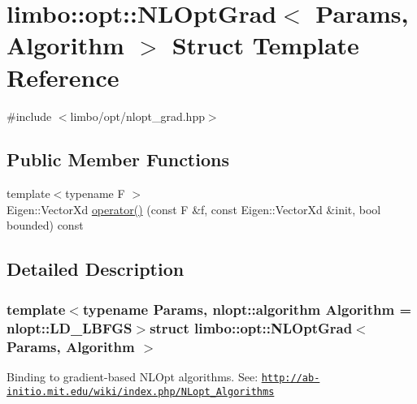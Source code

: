 \hypertarget{structlimbo_1_1opt_1_1_n_l_opt_grad}{}\section{limbo\+:\+:opt\+:\+:N\+L\+Opt\+Grad$<$ Params, Algorithm $>$ Struct Template Reference}
\label{structlimbo_1_1opt_1_1_n_l_opt_grad}


{\ttfamily \#include $<$limbo/opt/nlopt\+\_\+grad.\+hpp$>$}

\subsection*{Public Member Functions}
\begin{DoxyCompactItemize}
\item 
{\footnotesize template$<$typename F $>$ }\\Eigen\+::\+Vector\+Xd \hyperlink{structlimbo_1_1opt_1_1_n_l_opt_grad_a248805060cc986c4553d91f738b8b725}{operator()} (const F \&f, const Eigen\+::\+Vector\+Xd \&init, bool bounded) const 
\end{DoxyCompactItemize}


\subsection{Detailed Description}
\subsubsection*{template$<$typename Params, nlopt\+::algorithm Algorithm = nlopt\+::\+L\+D\+\_\+\+L\+B\+F\+G\+S$>$struct limbo\+::opt\+::\+N\+L\+Opt\+Grad$<$ Params, Algorithm $>$}

Binding to gradient-\/based N\+L\+Opt algorithms. See\+: \href{http://ab-initio.mit.edu/wiki/index.php/NLopt_Algorithms}{\tt http\+://ab-\/initio.\+mit.\+edu/wiki/index.\+php/\+N\+Lopt\+\_\+\+Algorithms}

